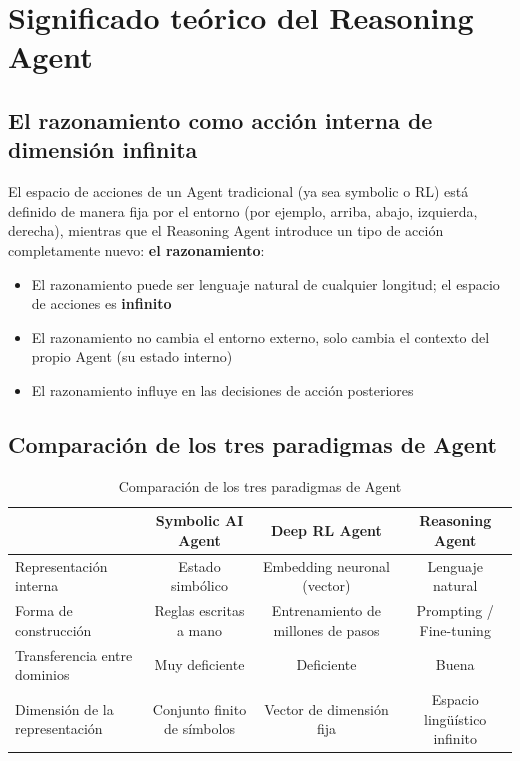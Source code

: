 \section{Significado teórico del Reasoning Agent}

\subsection{El razonamiento como acción interna de dimensión infinita}

El espacio de acciones de un Agent tradicional (ya sea symbolic o RL) está definido de manera fija por el entorno (por ejemplo, arriba, abajo, izquierda, derecha), mientras que el Reasoning Agent introduce un tipo de acción completamente nuevo: \textbf{el razonamiento}:

\begin{itemize}
    \item El razonamiento puede ser lenguaje natural de cualquier longitud; el espacio de acciones es \textbf{infinito}
    \item El razonamiento no cambia el entorno externo, solo cambia el contexto del propio Agent (su estado interno)
    \item El razonamiento influye en las decisiones de acción posteriores
\end{itemize}

\subsection{Comparación de los tres paradigmas de Agent}

\begin{table}[H]
\centering
\begin{tabular}{lccc}
\toprule
& \textbf{Symbolic AI Agent} & \textbf{Deep RL Agent} & \textbf{Reasoning Agent} \\
\midrule
Representación interna & Estado simbólico & Embedding neuronal (vector) & Lenguaje natural \\
Forma de construcción & Reglas escritas a mano & Entrenamiento de millones de pasos & Prompting / Fine-tuning \\
Transferencia entre dominios & Muy deficiente & Deficiente & Buena \\
Dimensión de la representación & Conjunto finito de símbolos & Vector de dimensión fija & Espacio lingüístico infinito \\
\bottomrule
\end{tabular}
\caption{Comparación de los tres paradigmas de Agent}
\end{table}

